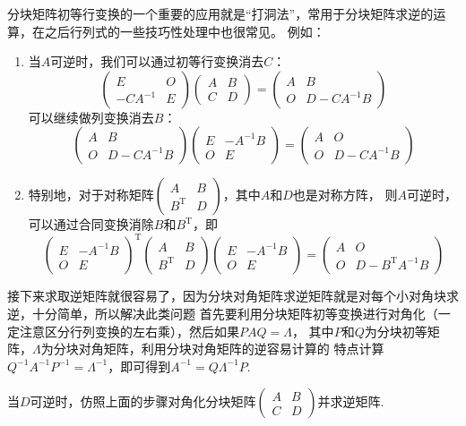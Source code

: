 分块矩阵初等行变换的一个重要的应用就是“打洞法”，常用于分块矩阵求逆的运算，在之后行列式的一些技巧性处理中也很常见。
例如：
\begin{enumerate}
	\item 当$A$可逆时，我们可以通过初等行变换消去$C$：
	$$\begin{pmatrix}
		E & O \\ -CA^{-1} & E
	\end{pmatrix}\begin{pmatrix}
		A & B \\ C & D
	\end{pmatrix}=\begin{pmatrix}
		A & B \\ O & D-CA^{-1}B
	\end{pmatrix}$$
	可以继续做列变换消去$B$：
	$$\begin{pmatrix}
		A & B \\ O & D-CA^{-1}B
	\end{pmatrix}\begin{pmatrix}
		E & -A^{-1}B \\ O & E
	\end{pmatrix}=\begin{pmatrix}
		A & O \\ O & D-CA^{-1}B
	\end{pmatrix}$$
	\item 特别地，对于对称矩阵$\begin{pmatrix}A & B \\ B^\mathrm{T} & D\end{pmatrix}$，其中$A$和$D$也是对称方阵，
	则$A$可逆时，可以通过合同变换消除$B$和$B^\mathrm{T}$，即
	$$\begin{pmatrix}
		E & -A^{-1}B \\ O & E
	\end{pmatrix}^\mathrm{T}\begin{pmatrix}
		A & B \\ B^\mathrm{T} & D
	\end{pmatrix}\begin{pmatrix}
		E & -A^{-1}B \\ O & E
	\end{pmatrix}=\begin{pmatrix}
		A & O \\ O & D-B^\mathrm{T}A^{-1}B
	\end{pmatrix}$$
\end{enumerate}
接下来求取逆矩阵就很容易了，因为分块对角矩阵求逆矩阵就是对每个小对角块求逆，十分简单，所以解决此类问题
首先要利用分块矩阵初等变换进行对角化（一定注意区分行列变换的左右乘），然后如果$PAQ=\Lambda$，
其中$P$和$Q$为分块初等矩阵，$\Lambda$为分块对角矩阵，利用分块对角矩阵的逆容易计算的
特点计算$Q^{-1}A^{-1}P^{-1}=\Lambda^{-1}$，即可得到$A^{-1}=Q\Lambda^{-1}P$.
\begin{example}
	当$D$可逆时，仿照上面的步骤对角化分块矩阵$\begin{pmatrix}A & B \\ C & D\end{pmatrix}$并求逆矩阵.
\end{example}

